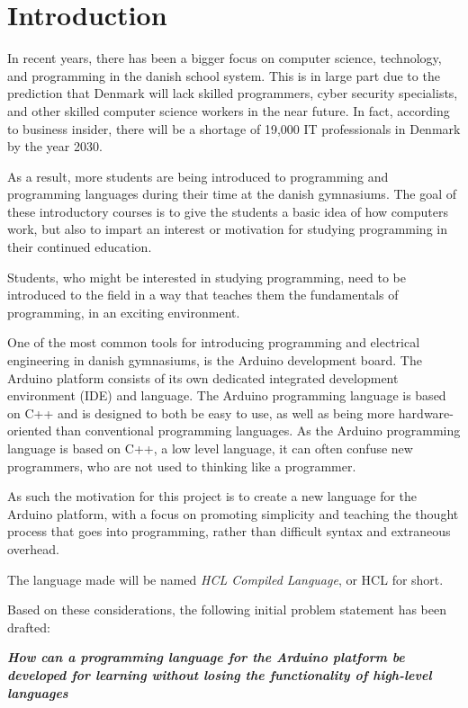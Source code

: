 \chapter{Introduction}
In recent years, there has been a bigger focus on computer science, technology, and programming in the danish school system.
This is in large part due to the prediction that Denmark will lack skilled programmers, cyber security specialists, and other skilled computer science workers in the near future.
In fact, according to business insider, there will be a shortage of 19,000 IT professionals in Denmark by the year 2030\cite{ITLackDK}.

As a result, more students are being introduced to programming and programming languages during their time at the
danish gymnasiums. 
The goal of these introductory courses is to give the students a basic idea of how computers work, but also to impart an interest or motivation for studying programming in their continued education.

Students, who might be interested in studying programming, need to be introduced to the field in a way that teaches them the fundamentals of programming, in an exciting environment.

One of the most common tools for introducing programming and electrical engineering in danish gymnasiums, is the Arduino development board. 
The Arduino platform consists of its own dedicated integrated development environment (IDE) and language.
The Arduino programming language is based on C++ and is designed to both be easy to use, as well as being more hardware-oriented than conventional programming languages\cite{ArFAQ}.
As the Arduino programming language is based on C++, a low level language, it can often confuse new programmers, who are not used to thinking like a programmer.

As such the motivation for this project is to create a new language for the Arduino platform, with a focus on promoting simplicity and teaching the thought process that goes into programming, rather than difficult syntax and extraneous overhead.

The language made will be named \textit{HCL Compiled Language}, or HCL for short.

Based on these considerations, the following initial problem statement has been drafted:

\begin{center}
	\textit{\textbf{How can a programming language for the Arduino platform be developed for learning without losing the functionality of high-level languages}}
\end{center}
